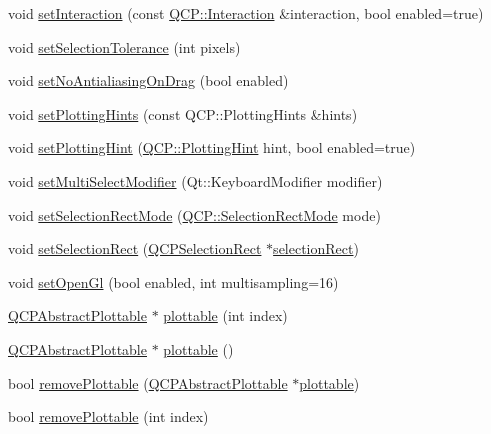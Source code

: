 \begin{DoxyCompactItemize}
void \hyperlink{classQCustomPlot_a422bf1bc6d56dac75a3d805d9a65902c}{set\+Interaction} (const \hyperlink{namespaceQCP_a2ad6bb6281c7c2d593d4277b44c2b037}{Q\+C\+P\+::\+Interaction} \&interaction, bool enabled=true)
\item 
void \hyperlink{classQCustomPlot_a4dc31241d7b09680950e19e5f971ed93}{set\+Selection\+Tolerance} (int pixels)
\item 
void \hyperlink{classQCustomPlot_a775bdcb6329d44701aeaa6135b0e5265}{set\+No\+Antialiasing\+On\+Drag} (bool enabled)
\item 
void \hyperlink{classQCustomPlot_a94a33cbdadbbac5934843508bcfc210d}{set\+Plotting\+Hints} (const Q\+C\+P\+::\+Plotting\+Hints \&hints)
\item 
void \hyperlink{classQCustomPlot_a3b7c97bb6c16464e9e15190c07abe9a9}{set\+Plotting\+Hint} (\hyperlink{namespaceQCP_a5400e5fcb9528d92002ddb938c1f4ef4}{Q\+C\+P\+::\+Plotting\+Hint} hint, bool enabled=true)
\item 
void \hyperlink{classQCustomPlot_a8fc96e3b5138a06759a2a90c166df516}{set\+Multi\+Select\+Modifier} (Qt\+::\+Keyboard\+Modifier modifier)
\item 
void \hyperlink{classQCustomPlot_a810ef958ebe84db661c7288b526c0deb}{set\+Selection\+Rect\+Mode} (\hyperlink{namespaceQCP_ac9aa4d6d81ac76b094f9af9ad2d3aacf}{Q\+C\+P\+::\+Selection\+Rect\+Mode} mode)
\item 
void \hyperlink{classQCustomPlot_a0c09f96df15faa4799ad7051bb16cf33}{set\+Selection\+Rect} (\hyperlink{classQCPSelectionRect}{Q\+C\+P\+Selection\+Rect} $\ast$\hyperlink{classQCustomPlot_ae64a3994735d8f592a60d9430526a163}{selection\+Rect})
\item 
void \hyperlink{classQCustomPlot_a7db1adc09016329f3aef7c60da935789}{set\+Open\+Gl} (bool enabled, int multisampling=16)
\item 
\hyperlink{classQCPAbstractPlottable}{Q\+C\+P\+Abstract\+Plottable} $\ast$ \hyperlink{classQCustomPlot_a32de81ff53e263e785b83b52ecd99d6f}{plottable} (int index)
\item 
\hyperlink{classQCPAbstractPlottable}{Q\+C\+P\+Abstract\+Plottable} $\ast$ \hyperlink{classQCustomPlot_adea38bdc660da9412ba69fb939031567}{plottable} ()
\item 
bool \hyperlink{classQCustomPlot_af3dafd56884208474f311d6226513ab2}{remove\+Plottable} (\hyperlink{classQCPAbstractPlottable}{Q\+C\+P\+Abstract\+Plottable} $\ast$\hyperlink{classQCustomPlot_a32de81ff53e263e785b83b52ecd99d6f}{plottable})
\item 
bool \hyperlink{classQCustomPlot_afc210e0021480f8119bccf37839dbcc8}{remove\+Plottable} (int index)

\end{DoxyCompactItemize}
